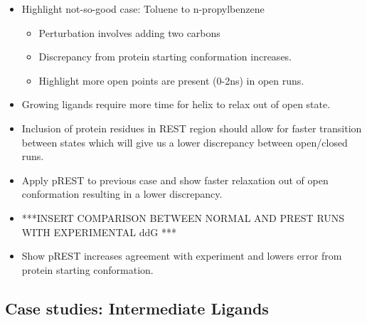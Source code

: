 \documentclass{article}
\begin{document}
\begin{itemize}
   \item Highlight not-so-good case: Toluene to n-propylbenzene
      \begin{itemize}
      \item Perturbation involves adding two carbons
      \item Discrepancy from protein starting conformation increases.
      \item Highlight more open points are present (0-2ns) in open runs.
      \end{itemize}
   \item Growing ligands require more time for helix to relax out of open state.
   \item Inclusion of protein residues in REST region should allow for faster transition between states which will give us a lower discrepancy between open/closed runs.
   \item Apply pREST to previous case and show faster relaxation out of open conformation resulting in a lower discrepancy.
   \item ***INSERT COMPARISON BETWEEN NORMAL AND PREST RUNS WITH EXPERIMENTAL ddG ***
   \item Show pREST increases agreement with experiment and lowers error from protein starting conformation.
   \end{itemize}

\subsection{Case studies: Intermediate Ligands}


   

\pagebreak


\end{document}
